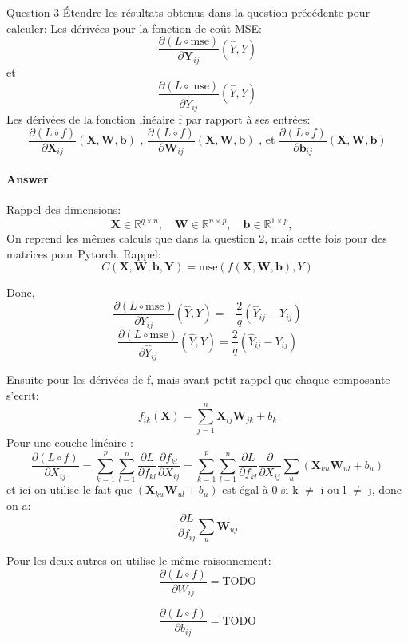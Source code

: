 \documentclass[12pt,a4paper]{article}
\begin{document}
\begin{section}{Question 3}
Étendre les résultats obtenus dans la question précédente pour calculer: \newline
Les dérivées pour la fonction de coût MSE:
\[
\frac{\partial (L\circ \text{mse})}{\partial \mathbf{Y}_{ij}}(\hat{Y}, Y)
\]
et
\[\frac{\partial (L\circ \text{mse})}{\partial \hat{Y}_{ij}}(\hat{Y}, Y)\]
Les dérivées de la fonction linéaire f par rapport à ses entrées:
\[
\frac{\partial (L\circ f)}{\partial \mathbf{X}_{ij}}(\mathbf{X}, \mathbf{W}, \mathbf{b}) \text{ , }
\frac{\partial (L\circ f)}{\partial \mathbf{W}_{ij}}(\mathbf{X}, \mathbf{W}, \mathbf{b}) \text{ , et }
\frac{\partial (L\circ f)}{\partial \mathbf{b}_{ij}}(\mathbf{X}, \mathbf{W}, \mathbf{b})
\]

\paragraph{Answer}
Rappel des dimensions: 
\[
\mathbf{X} \in \mathbb{R}^{q \times n}, \quad
\mathbf{W} \in \mathbb{R}^{n \times p}, \quad
\mathbf{b} \in \mathbb{R}^{1 \times p}, \quad
\]
On reprend les mêmes calculs que dans la question 2, mais cette fois pour des matrices pour Pytorch.
Rappel:
\[
C(\mathbf{X}, \mathbf{W}, \mathbf{b}, \mathbf{Y}) = \text{mse}(f(\mathbf{X}, \mathbf{W}, \mathbf{b}), Y)
\]

Donc,
\[
\frac{\partial (L \circ \text{mse})}{\partial Y_{ij}}(\hat{Y}, Y) = -\frac{2}{q} (\hat{Y}_{ij} - Y_{ij})
\] 
\[
\frac{\partial (L \circ \text{mse})}{\partial \hat{Y}_{ij}}(\hat{Y}, Y) = \frac{2}{q} (\hat{Y}_{ij} - Y_{ij})
\] 

Ensuite pour les dérivées de f, mais avant petit rappel que chaque composante s'ecrit:
\[
f_{ik}(\mathbf{X}) = \sum_{j=1}^{n} \mathbf{X}_{ij} \mathbf{W}_{jk} + b_k
\]
Pour une couche linéaire :  
\[
\frac{\partial (L\circ f)}{\partial X_{ij}} = \sum_{k=1}^{p} \sum_{l=1}^{n} \frac{\partial L}{\partial f_{kl}} \frac{\partial f_{kl}}{\partial X_{ij}} = 
\sum_{k=1}^{p} \sum_{l=1}^{n} \frac{\partial L}{\partial f_{kl}} \frac{\partial}{\partial X_{ij}} \sum_{u} \left(\mathbf{X}_{ku} \mathbf{W}_{ul} + b_u \right)
\]
et ici on utilise le fait que $\left(\mathbf{X}_{ku} \mathbf{W}_{ul} + b_u \right)$ est égal à 0 si k $\neq$ i ou l $\neq$ j, donc on a:
\[
\frac{\partial L}{\partial f_{ij}} \sum_u \mathbf{W}_{uj}
\]

Pour les deux autres on utilise le même raisonnement:
\[
\frac{\partial (L\circ f)}{\partial W_{ij}} = \text{TODO}
\]

\[
\frac{\partial (L\circ f)}{\partial b_{ij}} = \text{TODO}
\]


\end{section}
\end{document}
